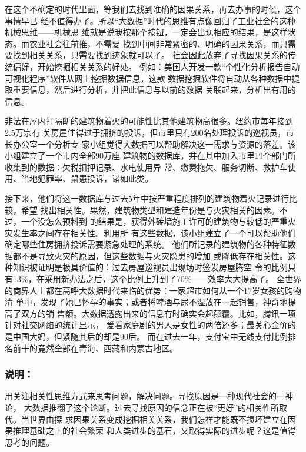 \documentclass[11pt]{ctexart}
\begin{document}
{{{{在这个不确定的时代里面，等我们去找到准确的因果关系，再去办事的时候，这个事情早已
经不值得办了。所以“大数据”时代的思维有点像回归了工业社会的这种机械思维——机械思
维就是说我按那个按钮，一定会出现相应的结果，是这样状态。而农业社会往前推，不需要
找到中间非常紧密的、明确的因果关系，而只需要找到相关关系，只需要找到迹象就可以了。
社会因此放弃了寻找因果关系的传统偏好，开始挖掘相关关系的好处。
例如：美国人开发一款“个性化分析报告自动可视化程序”软件从网上挖掘数据信息，这款
数据挖掘软件将自动从各种数据中提取重要信息，然后进行分析，并把此信息与以前的数据
关联起来，分析出有用的信息。

非法在屋内打隔断的建筑物着火的可能性比其他建筑物高很多。纽约市每年接到2.5万宗有
关房屋住得过于拥挤的投诉，但市里只有200名处理投诉的巡视员，市长办公室一个分析专
家小组觉得大数据可以帮助解决这一需求与资源的落差。该小组建立了一个市内全部90万座
建筑物的数据库，并在其中加入市里19个部门所收集到的数据：欠税扣押记录、水电使用异
常、缴费拖欠、服务切断、救护车使用、当地犯罪率、鼠患投诉，诸如此类。

接下来，他们将这一数据库与过去5年中按严重程度排列的建筑物着火记录进行比较，希望
找出相关性。果然，建筑物类型和建造年份是与火灾相关的因素。不过，一个没怎么预料到
的结果是，获得外砖墙施工许可的建筑物与较低的严重火灾发生率之间存在相关性。利用所
有这些数据，该小组建立了一个可以帮助他们确定哪些住房拥挤投诉需要紧急处理的系统。
他们所记录的建筑物的各种特征数据都不是导致火灾的原因，但这些数据与火灾隐患的增加
或降低存在相关性。这种知识被证明是极具价值的：过去房屋巡视员出现场时签发房屋腾空
令的比例只有13\%，在采用新办法之后，这个比例上升到了70\%——效率大大提高了。
全世界的商界人士都在高呼大数据时代来临的优势：一家超市如何从一个17岁女孩的购物清
单中，发现了她已怀孕的事实；或者将啤酒与尿不湿放在一起销售，神奇地提高了双方的销
售额。大数据透露出来的信息有时确实会起颠覆。比如，腾讯一项针对社交网络的统计显示，
爱看家庭剧的男人是女性的两倍还多；最关心金价的是中国大妈，但紧随其后的却是90后。
而在过去一年，支付宝中无线支付比例排名前十的竟然全部在青海、西藏和内蒙古地区。

\subsubsection{说明：}
\label{sec:orge1c2f2d}

用关注相关性思维方式来思考问题，解决问题。寻找原因是一种现代社会的一神论，
大数据推翻了这个论断。过去寻找原因的信念正在被“更好”的相关性所取代。当世界由探
求因果关系变成挖掘相关关系，我们怎样才能既不损坏建立在因果推理基础之上的社会繁荣
和人类进步的基石，又取得实际的进步呢？这是值得思考的问题。

}}}}
\end{document}
